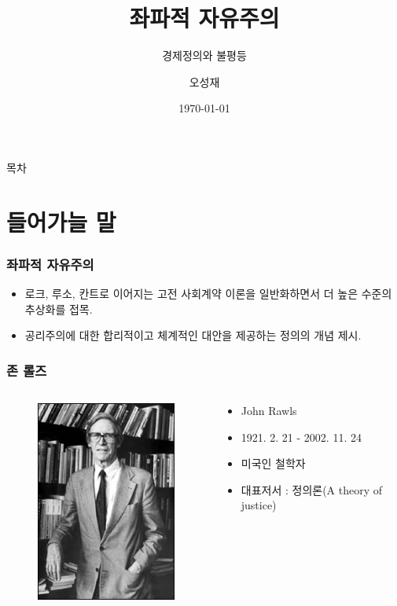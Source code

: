 \documentclass[aspectratio=169,xcolor=dvipsnames,handout]{beamer}
\title[좌파적 자유주의]{좌파적 자유주의} %
\subtitle{경제정의와 불평등}
\author[오성재]{오성재}
\institute[HNU] %
{
    한남대학교 \\
    탈메이지 교양학부 \\
}
\date{\today} %
\begin{document}
\begin{frame}
    \titlepage
\end{frame}

\begin{frame}{목차}
    \tableofcontents
\end{frame}

\section{들어가늘 말}

\begin{frame}[<+->]
\frametitle{좌파적 자유주의}
    \begin{itemize}
        \item 로크, 루소, 칸트로 이어지는 고전 사회계약 이론을 일반화하면서 더 높은 수준의 추상화를 접목.
        \item 공리주의에 대한 합리적이고 체계적인 대안을 제공하는 정의의 개념 제시.
    \end{itemize}
\end{frame}

\begin{frame}[<+->]
\frametitle{존 롤즈}
    \begin{columns}
        \begin{column}{.5\textwidth}
            \begin{figure}
                \centering
                \includegraphics[width=.5\textwidth]{pic/Rawls_portrait.png}
            \end{figure}
        \end{column}    
        \begin{column}{.5\textwidth}
            \begin{itemize}
            \item John Rawls 
            \item 1921. 2. 21 - 2002. 11. 24
            \item 미국인 철학자
            \item 대표저서 : 정의론(A theory of justice)
            \end{itemize}
        \end{column}    
    \end{columns}
\end{frame}
\end{document}

